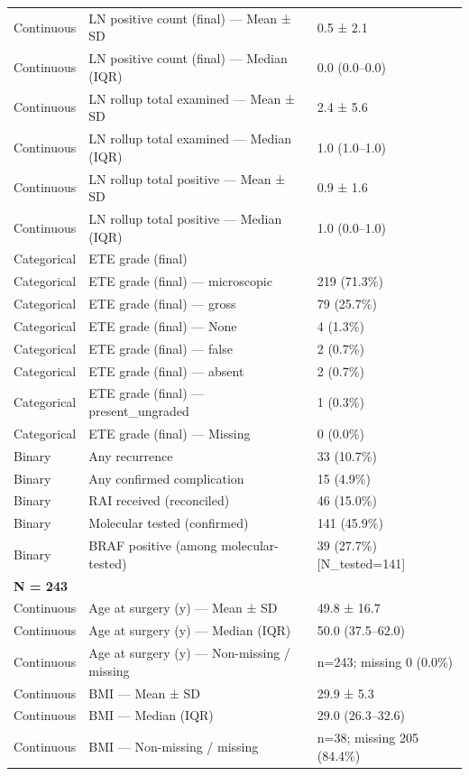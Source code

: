\begin{table}[htbp]
\begin{tabular}{lll}
Continuous & LN positive count (final) — Mean ± SD & 0.5 ± 2.1 \\
Continuous & LN positive count (final) — Median (IQR) & 0.0 (0.0–0.0) \\
Continuous & LN rollup total examined — Mean ± SD & 2.4 ± 5.6 \\
Continuous & LN rollup total examined — Median (IQR) & 1.0 (1.0–1.0) \\
Continuous & LN rollup total positive — Mean ± SD & 0.9 ± 1.6 \\
Continuous & LN rollup total positive — Median (IQR) & 1.0 (0.0–1.0) \\
Categorical & ETE grade (final) &  \\
Categorical & ETE grade (final) — microscopic & 219 (71.3\%) \\
Categorical & ETE grade (final) — gross & 79 (25.7\%) \\
Categorical & ETE grade (final) — None & 4 (1.3\%) \\
Categorical & ETE grade (final) — false & 2 (0.7\%) \\
Categorical & ETE grade (final) — absent & 2 (0.7\%) \\
Categorical & ETE grade (final) — present\_ungraded & 1 (0.3\%) \\
Categorical & ETE grade (final) — Missing & 0 (0.0\%) \\
Binary & Any recurrence & 33 (10.7\%) \\
Binary & Any confirmed complication & 15 (4.9\%) \\
Binary & RAI received (reconciled) & 46 (15.0\%) \\
Binary & Molecular tested (confirmed) & 141 (45.9\%) \\
Binary & BRAF positive (among molecular-tested) & 39 (27.7\%) [N\_tested=141] \\
\multicolumn{3}{l}{\textbf{N = 243}} \\
Continuous & Age at surgery (y) — Mean ± SD & 49.8 ± 16.7 \\
Continuous & Age at surgery (y) — Median (IQR) & 50.0 (37.5–62.0) \\
Continuous & Age at surgery (y) — Non-missing / missing & n=243; missing 0 (0.0\%) \\
Continuous & BMI — Mean ± SD & 29.9 ± 5.3 \\
Continuous & BMI — Median (IQR) & 29.0 (26.3–32.6) \\
Continuous & BMI — Non-missing / missing & n=38; missing 205 (84.4\%) \\

\end{tabular}
\end{table}
